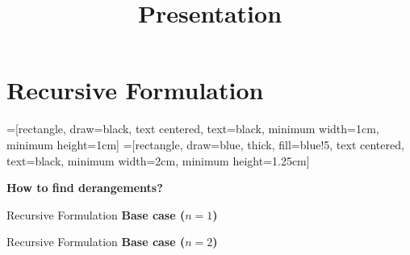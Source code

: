 \documentclass[9pt]{beamer}
\title[Presentation]{Presentation} %
\begin{document}
\section{Recursive Formulation}

=[rectangle, draw=black,
           text centered, text=black, minimum width=1cm, minimum height=1cm]
=[rectangle, draw=blue, thick, fill=blue!5,
           text centered, text=black, minimum width=2cm, minimum height=1.25cm]
\begin{frame}
\centering
\Huge \textbf{ How to find derangements? }
\end{frame}

\begin{frame} {Recursive Formulation}
    \Large {\textbf{Base case ($n = 1$)}} \\
    \vspace{1cm}
    \begin{figure}
        \centering
    \end{figure}
\end{frame}


\begin{frame} {Recursive Formulation}
    \Large {\textbf{Base case ($n = 2$)}} \\
    \vspace{1cm}
    \begin{figure}
        \centering
    \end{figure}
\end{frame}
\end{document}
